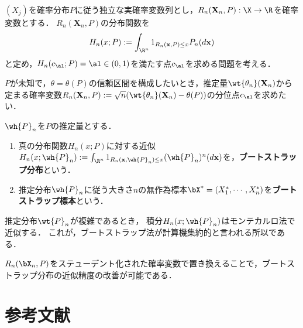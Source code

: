 \documentclass[uplatex,dvipdfmx]{jsreport}
\begin{document}
\begin{notation}
    $(X_j)$を確率分布$P$に従う独立な実確率変数列とし，$R_n(\mathbf{X}_n,P):\X\to\R$を確率変数とする．
    $R_n(\mathbf{X}_n,P)$の分布関数を
    \[H_n(x;P):=\int_{\R^n}1_{R_n(\mathbf{x},P)\le x}P_n(d\mathbf{x})\]
    と定め，$H_n(c_\al;P)=\al\in(0,1)$を満たす点$c_\al$を求める問題を考える．
\end{notation}
\begin{example}
    $P$が未知で，$\theta=\theta(P)$の信頼区間を構成したいとき，推定量$\wt{\theta_n}(\mathbf{X}_n)$から定まる確率変数$R_n(\mathbf{X}_n,P):=\sqrt{n}(\wt{\theta_n}(\mathbf{X}_n)-\theta(P))$の分位点$c_\al$を求めたい．
\end{example}

\begin{definition}
    $\wh{P}_n$を$P$の推定量とする．
    \begin{enumerate}
        \item 真の分布関数$H_n(x;P)$に対する近似$H_n(x;\wh{P}_n):=\int_{\R^n}1_{R_n(\mathbf{x},\wh{P}_n)\le x}(\wh{P}_n)^n(d\mathbf{x})$を，\textbf{ブートストラップ分布}という．
        \item 推定分布$\wh{P}_n$に従う大きさ$n$の無作為標本$\bX^*=(X^*_1,\cdots,X^*_n)$を\textbf{ブートストラップ標本}という．
    \end{enumerate}
\end{definition}
\begin{remark}
    推定分布$\wt{P}_n$が複雑であるとき，
    積分$H_n(x;\wh{P}_n)$はモンテカルロ法で近似する．
    これが，ブートストラップ法が計算機集約的と言われる所以である．
\end{remark}
\begin{remark}[studentization]
    $R_n(\bX_n,P)$をステューデント化された確率変数で置き換えることで，ブートストラップ分布の近似精度の改善が可能である．
\end{remark}

\chapter{参考文献}
\end{document}
